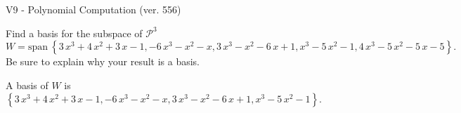 \begin{exercise}
  \begin{exerciseTitle}V9 - Polynomial Computation (ver. 556)\end{exerciseTitle}
  \begin{exerciseStatement}
    Find a basis for the subspace of \(\mathcal{P}^3\) 
\[W=\mathrm{span}\ \left\{3 \, x^{3} + 4 \, x^{2} + 3 \, x - 1 , -6 \, x^{3} - x^{2} - x , 3 \, x^{3} - x^{2} - 6 \, x + 1 , x^{3} - 5 \, x^{2} - 1 , 4 \, x^{3} - 5 \, x^{2} - 5 \, x - 5\right\}.\]
 Be sure to explain why your result is a basis.


  \end{exerciseStatement}
  \begin{exerciseAnswer}
   A basis of \(W\) is  \(\left\{3 \, x^{3} + 4 \, x^{2} + 3 \, x - 1 , -6 \, x^{3} - x^{2} - x , 3 \, x^{3} - x^{2} - 6 \, x + 1 , x^{3} - 5 \, x^{2} - 1\right\}\).
  


  \end{exerciseAnswer}
\end{exercise}
